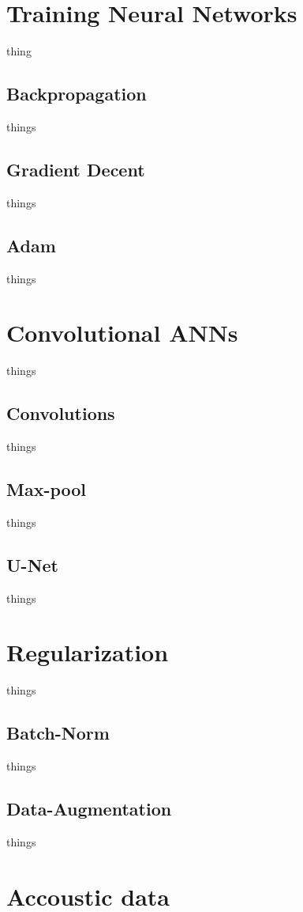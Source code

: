 \section{Training Neural Networks} \label{training neural networks}
    thing
\subsection{Backpropagation}
    things

\subsection{Gradient Decent}
    things

\subsection{Adam}
    things

\section{Convolutional ANNs}
    things

\subsection{Convolutions}
    things
    
\subsection{Max-pool}
    things

\subsection{U-Net}
        things

\section{Regularization}
    things
    
\subsection{Batch-Norm}
    things

\subsection{Data-Augmentation}
    things
    
\section{Accoustic data}

    
    